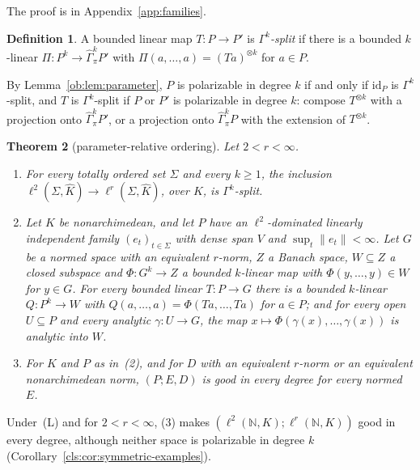 \documentclass[11pt]{amsart}
\newtheorem{theorem}{Theorem}[section]
\theoremstyle{definition}
\newtheorem{definition}[theorem]{Definition}
\theoremstyle{remark}
\numberwithin{equation}{section}
\newcommand{\N}{\mathbb N}
\newcommand{\id}{\mathrm{id}}
\newcommand{\norm}[1]{\lVert #1\rVert}
\newcommand{\Kh}{\widehat K}
\theoremstyle{plain}
\theoremstyle{definition}
\theoremstyle{plain}
\newcommand{\hGamma}{\widehat\Gamma}
\begin{document}
The proof is in Appendix~\ref{app:families}.

\begin{definition}\label{fam2:def:gamma-split}
A bounded linear map $T\colon P\to P'$ is \emph{$\Gamma^k$-split} if there is a bounded $k$-linear
$\Pi\colon P^k\to\hGamma^k_\pi P'$ with $\Pi(a,\dots,a)=(Ta)^{\otimes k}$ for $a\in P$.
\end{definition}

By Lemma~\ref{ob:lem:parameter}, $P$ is polarizable in degree $k$ if and only if $\id_P$ is $\Gamma^k$-split, and $T$ is
$\Gamma^k$-split if $P$ or $P'$ is polarizable in degree $k$: compose $T^{\otimes k}$ with a projection onto
$\hGamma^k_\pi P'$, or a projection onto $\hGamma^k_\pi P$ with the extension of $T^{\otimes k}$.

\begin{theorem}[parameter-relative ordering]\label{fam2:thm:gamma-split}
Let $2<r<\infty$.
\begin{enumerate}
\item For every totally ordered set $\Sigma$ and every $k\ge1$, the inclusion $\ell^2(\Sigma,\Kh)\to\ell^r(\Sigma,\Kh)$,
over $K$, is $\Gamma^k$-split.
\item Let $K$ be nonarchimedean, and let $P$ have an $\ell^2$-dominated linearly independent family $(e_t)_{t\in\Sigma}$ with dense span $V$ and
$\sup_t\norm{e_t}<\infty$. Let $G$ be a normed space with an equivalent $r$-norm, $Z$ a Banach space, $W\subseteq Z$ a
closed subspace and $\Phi\colon G^k\to Z$ a bounded $k$-linear map with $\Phi(y,\dots,y)\in W$ for $y\in G$. For every
bounded linear $T\colon P\to G$ there is a bounded $k$-linear $Q\colon P^k\to W$ with $Q(a,\dots,a)=\Phi(Ta,\dots,Ta)$ for
$a\in P$; and for every open $U\subseteq P$ and every analytic $\gamma\colon U\to G$, the map
$x\mapsto\Phi(\gamma(x),\dots,\gamma(x))$ is analytic into $W$.
\item For $K$ and $P$ as in~(2), and for $D$ with an equivalent $r$-norm or an equivalent nonarchimedean norm, $(P;E,D)$ is good in every degree for every normed $E$.
\end{enumerate}
\end{theorem}

Under~\textup{(L)} and for $2<r<\infty$, (3) makes $(\ell^2(\N,K);\ell^r(\N,K))$ good in every degree, although neither
space is polarizable in degree $k$ (Corollary~\ref{cls:cor:symmetric-examples}).
\end{document}
